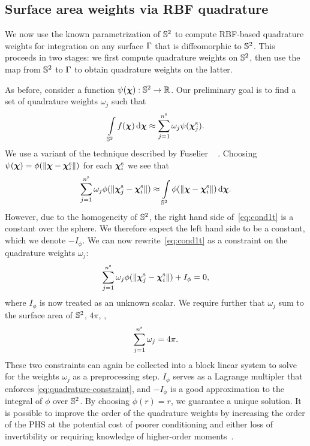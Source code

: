 \subsection{Surface area weights via RBF quadrature}
We now use the known parametrization of $\mathbb{S}^2$ to compute RBF-based quadrature weights
for integration on any surface $\Gamma$ that is diffeomorphic to $\mathbb{S}^2$. This
proceeds in two stages: we first compute quadrature weights on $\mathbb{S}^2$, then use the
map from $\mathbb{S}^2$ to $\Gamma$ to obtain quadrature weights on the latter.

As before, consider a function $\psi(\boldsymbol{\chi}):\mathbb{S}^2 \to \mathbb{R}$. Our preliminary goal
is to find a set of quadrature weights $\omega_j$ such that
\begin{equation*}
    \int\limits_{\sphere} f(\Xp) \d\Xp \approx \sum_{j=1}^{\sample\cardinality} \omega_j \psi(\sample\Xp_j).
\end{equation*}
We use a variant of the technique described by Fuselier ~%
\cite{Fuselier:2013coba}.  Choosing $\psi(\boldsymbol{\chi}) = \phi(\|\boldsymbol{\chi}-{\boldsymbol{\chi}}^\text{s}_i\|)$ for each
${\boldsymbol{\chi}}^\text{s}_i$ we see that
\begin{equation}
    \sum_{j=1}^{\sample\cardinality} \omega_j \phi(\|\sample\Xp_j-\sample\Xp_i\|)
    \approx \int\limits_{\sphere}\phi(\|\Xp-\sample\Xp_i\|) \d\Xp.
    \label{eq:cond1t}
\end{equation}
However, due to the homogeneity of $\mathbb{S}^2$, the right hand side of~\eqref{eq:cond1t} is
a constant over the sphere. We therefore expect the left hand side to be a constant,
which we denote $-I_\phi$. We can now rewrite~\eqref{eq:cond1t} as a constraint on the
quadrature weights $\omega_j$:
\begin{equation}
    \sum_{j=1}^{{n}^\text{s}} \omega_j\phi(\|{\boldsymbol{\chi}}^\text{s}_j-{\boldsymbol{\chi}}^\text{s}_i\|)  +  I_{\phi} = 0,
    \label{eq:quadrature-weights}
\end{equation}
where $I_{\phi}$ is now treated as an unknown scalar. We require further that $\omega_j$
sum to the surface area of $\mathbb{S}^2$, $4\pi$, ,
\begin{equation}
    \sum_{j=1}^{{n}^\text{s}} \omega_j  = 4\pi.
    \label{eq:quadrature-constraint}
\end{equation}
These two constraints can again be collected into a block linear system to solve for the
weights $\omega_j$ as a preprocessing step. $I_{\phi}$ serves as a Lagrange multipler
that enforces \eqref{eq:quadrature-constraint}, and $-I_\phi$ is a good approximation to
the integral of $\phi$ over $\mathbb{S}^2$. By choosing $\phi(r) = r$, we guarantee a unique
solution. It is possible to improve the order of the quadrature weights by increasing the
order of the PHS at the potential cost of poorer conditioning and either loss of
invertibility or requiring knowledge of higher-order moments~\cite{Fuselier:2013coba}.

